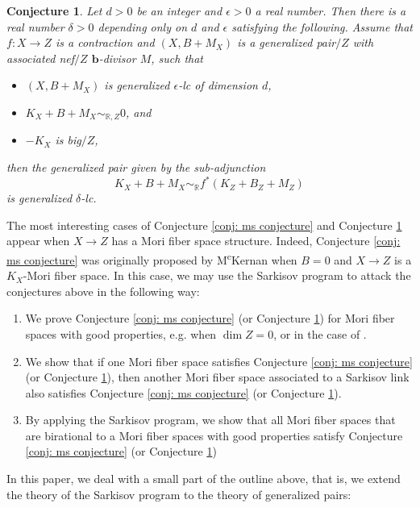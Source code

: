 \documentclass[11pt]{amsart}
\numberwithin{equation}{section}
\newcommand{\bb}{\bm{b}}
\newcommand{\Rr}{\mathbb{R}}
\newtheorem{conj}[thm]{Conjecture}
\theoremstyle{definition}
\theoremstyle{remark}
\theoremstyle{definition}
\begin{document}
\begin{conj}\label{conj: generalized ms conjecture}
Let $d>0$ be an integer and $\epsilon>0$ a real number. Then there is a real number $\delta>0$ depending only on $d$ and $\epsilon$ satisfying the following. Assume that $f:X\rightarrow Z$ is a contraction and $(X,B+M_X)$ is a generalized pair$/Z$ with associated nef$/Z$ $\bb$-divisor $M$, such that 
\begin{itemize}
    \item $(X,B+M_X)$ is generalized $\epsilon$-lc of dimension $d$,
    \item $K_X+B+M_X\sim_{\Rr,Z}0$, and
    \item $-K_X$ is big$/Z$,
\end{itemize}
then the generalized pair given by the sub-adjunction
$$K_X+B+M_X\sim_{\Rr}f^*(K_Z+B_Z+M_Z)$$
is generalized $\delta$-lc.
\end{conj}

The most interesting cases of Conjecture \ref{conj: ms conjecture} and Conjecture \ref{conj: generalized ms conjecture} appear when $X\rightarrow Z$ has a Mori fiber space structure. Indeed, Conjecture \ref{conj: ms conjecture} was originally proposed by M\textsuperscript{c}Kernan when $B=0$ and $X\rightarrow Z$ is a $K_X$-Mori fiber space. In this case, we may use the Sarkisov program to attack the conjectures above in the following way:
\begin{enumerate}
    \item We prove Conjecture \ref{conj: ms conjecture} (or Conjecture \ref{conj: generalized ms conjecture}) for Mori fiber spaces with good properties, e.g. when $\dim Z=0$, or in the case of \cite[Theorem 1.8, 1.9]{Bir18}.
    \item We show that if one Mori fiber space satisfies Conjecture \ref{conj: ms conjecture} (or Conjecture \ref{conj: generalized ms conjecture}), then another Mori fiber space associated to a Sarkisov link also satisfies Conjecture \ref{conj: ms conjecture} (or Conjecture \ref{conj: generalized ms conjecture}).
    \item By applying the Sarkisov program, we show that all Mori fiber spaces that are birational to a Mori fiber spaces with good properties satisfy  Conjecture \ref{conj: ms conjecture} (or Conjecture \ref{conj: generalized ms conjecture})
\end{enumerate}


In this paper, we deal with a small part of the outline above, that is, we extend the theory of the Sarkisov program to the theory of generalized pairs:
\end{document}
